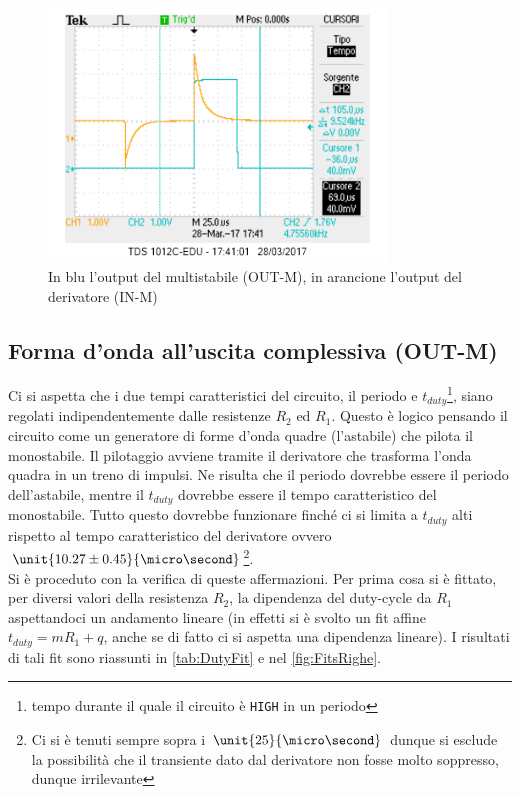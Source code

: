 \documentclass[a4paper,10pt]{article}
\def\code#1{\texttt{#1}}
\begin{document}


\begin{figure}[H]
	\centering
	\includegraphics[width=0.8\textwidth]{../grafici/4InMOutM.png}
	\caption{In blu l'output del multistabile (OUT-M), in arancione l'output del derivatore (IN-M)}
	\label{fig:InMOutM}
\end{figure}

\pagebreak[1]
\subsection{Forma d'onda all'uscita complessiva (OUT-M)}

Ci si aspetta che i due tempi caratteristici del circuito, il periodo e $t_{duty}$\footnote{tempo durante il quale il circuito è \code{HIGH} in un periodo}, siano regolati indipendentemente dalle resistenze $R_2$ ed $R_1$. Questo è logico pensando il circuito come un generatore di forme d'onda quadre (l'astabile) che pilota il monostabile. Il pilotaggio avviene tramite il derivatore che trasforma l'onda quadra in un treno di impulsi. Ne risulta che il periodo dovrebbe essere il periodo dell'astabile, mentre il $t_{duty}$ dovrebbe essere il tempo caratteristico del monostabile. Tutto questo dovrebbe funzionare finché ci si limita a $t_{duty}$ alti rispetto al tempo caratteristico del derivatore ovvero $\unit{10.27 \pm 0.45}{\micro\second}$\footnote{Ci si è tenuti sempre sopra i $\unit{25}{\micro\second}$ dunque si esclude la possibilità che il transiente dato dal derivatore non fosse molto soppresso, dunque irrilevante}.\\
Si è proceduto con la verifica di queste affermazioni. Per prima cosa si è fittato, per diversi valori della resistenza $R_2$, la dipendenza del duty-cycle da $R_1$ aspettandoci un andamento lineare (in effetti si è svolto un fit affine $t_{duty}=mR_1+q$, anche se di fatto ci si aspetta una dipendenza lineare). I risultati di tali fit sono riassunti in \cref{tab:DutyFit} e nel \cref{fig:FitsRighe}. 
\end{document}
